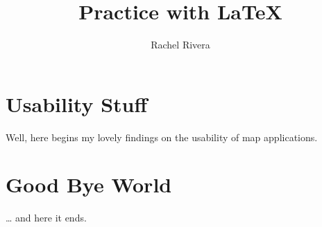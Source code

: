 \documentclass[a4paper,11pt]{article}
\author{Rachel Rivera}
\title{Practice with LaTeX}
\begin{document}
\maketitle
\tableofcontents
\section{Usability Stuff}
Well, here begins my lovely findings on the usability of map applications.
\section{Good Bye World}
\ldots{} and here it ends.
\end{document}
